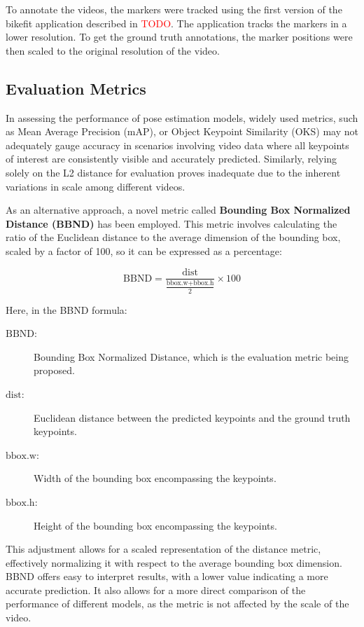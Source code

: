 To annotate the videos, the markers were tracked using the first version of the bikefit application described in \textcolor{red}{TODO}. The application tracks the markers in a lower resolution. To get the ground truth annotations, the marker positions were then scaled to the original resolution of the video.

\subsection{Evaluation Metrics}
\label{evaluation_metrics}

In assessing the performance of pose estimation models, widely used metrics, such as Mean Average Precision (mAP), or Object Keypoint Similarity (OKS) may not adequately gauge accuracy in scenarios involving video data where all keypoints of interest are consistently visible and accurately predicted. Similarly, relying solely on the L2 distance for evaluation proves inadequate due to the inherent variations in scale among different videos.

As an alternative approach, a novel metric called \textbf{Bounding Box Normalized Distance (BBND)} has been employed. This metric involves calculating the ratio of the Euclidean distance to the average dimension of the bounding box, scaled by a factor of 100, so it can be expressed as a percentage:

$$ \text{BBND} = \frac{\text{dist}}{\frac{\text{bbox.w} + \text{bbox.h}}{2}} \times 100 $$

Here, in the BBND formula:
\begin{description}
    \item[$\text{BBND}$:] Bounding Box Normalized Distance, which is the evaluation metric being proposed.
    \item[$\text{dist}$:] Euclidean distance between the predicted keypoints and the ground truth keypoints.
    \item[$\text{bbox.w}$:] Width of the bounding box encompassing the keypoints.
    \item[$\text{bbox.h}$:] Height of the bounding box encompassing the keypoints.
\end{description}

This adjustment allows for a scaled representation of the distance metric, effectively normalizing it with respect to the average bounding box dimension. BBND offers easy to interpret results, with a lower value indicating a more accurate prediction. It also allows for a more direct comparison of the performance of different models, as the metric is not affected by the scale of the video.

